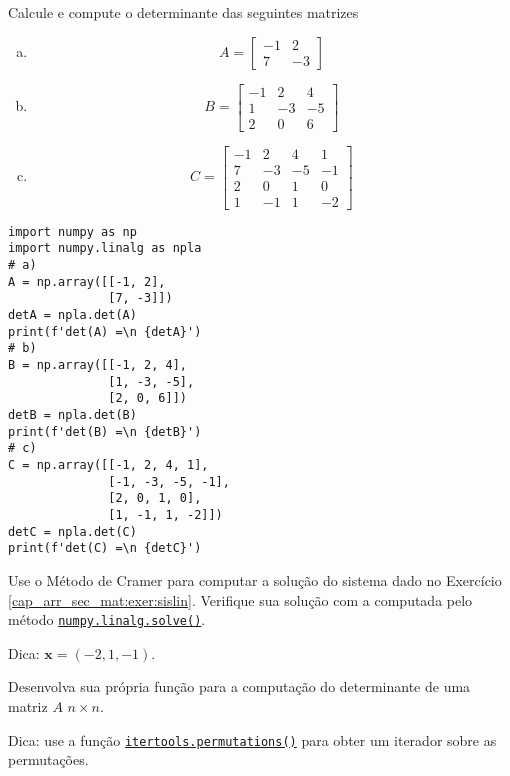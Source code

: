 \begin{exer}
  Calcule e compute o determinante das seguintes matrizes
  \begin{enumerate}[a)]
  \item
    \begin{equation}
      A =
      \begin{bmatrix}
        -1 & 2\\
        7 & -3
      \end{bmatrix}
    \end{equation}
  \item
    \begin{equation}
      B =
      \begin{bmatrix}
        -1 & 2 & 4\\
        1 & -3 & -5\\
        2 & 0 & 6
      \end{bmatrix}
    \end{equation}
  \item
    \begin{equation}
      C =
      \begin{bmatrix}
        -1 & 2 & 4 & 1\\
        7 & -3 & -5 & -1\\
        2 & 0 & 1 & 0\\
        1 & -1 & 1 & -2
      \end{bmatrix}
    \end{equation}
  \end{enumerate}
\end{exer}
\begin{resp}
\begin{lstlisting}
import numpy as np
import numpy.linalg as npla
# a)
A = np.array([[-1, 2],
              [7, -3]])
detA = npla.det(A)
print(f'det(A) =\n {detA}')
# b)
B = np.array([[-1, 2, 4],
              [1, -3, -5],
              [2, 0, 6]])
detB = npla.det(B)
print(f'det(B) =\n {detB}')
# c)
C = np.array([[-1, 2, 4, 1],
              [-1, -3, -5, -1],
              [2, 0, 1, 0],
              [1, -1, 1, -2]])
detC = npla.det(C)
print(f'det(C) =\n {detC}')
\end{lstlisting}
\end{resp}

\begin{exer}
  Use o Método de Cramer para computar a solução do sistema dado no Exercício \ref{cap_arr_sec_mat:exer:sislin}. Verifique sua solução com a computada pelo método \href{https://numpy.org/doc/stable/reference/generated/numpy.linalg.solve.html}{\lstinline+numpy.linalg.solve()+}.
\end{exer}
\begin{resp}
  Dica: $\pmb{x} = (-2, 1, -1)$.
\end{resp}

\begin{exer}
  Desenvolva sua própria função {\python} para a computação do determinante de uma matriz $A$ $n\times n$.
\end{exer}
\begin{resp}
  Dica: use a função \href{https://docs.python.org/3/library/itertools.html\#itertools.permutations}{\lstinline+itertools.permutations()+} para obter um iterador sobre as permutações.
\end{resp}